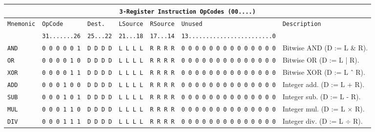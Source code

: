 \documentclass{report}
\begin{document}
{\footnotesize
\begin{center}
\begin{tabular}[ht]{
	| p{} | p{} | p{} | p{}
	| p{} | p{} | p{} |
}
	\hline
	\multicolumn{7}{|c|}{\texttt{3-Register Instruction OpCodes (00....)}} \\
	\hline \hline
	
	\multirow{2}{*}{\texttt{Mnemonic}} & \texttt{OpCode} & \texttt{Dest.} & \texttt{LSource} & \texttt{RSource} &
		\texttt{Unused} & \multirow{2}{*}{\texttt{Description}} \\
	& \texttt{31.......26} & \texttt{25...22} & \texttt{21...18} & \texttt{17...14} &
		\texttt{13........................0} & \\
	\hline
	
	\texttt{AND} & \texttt{0 0 0 0 0 1} & \texttt{D D D D} & \texttt{L L L L} & \texttt{R R R R} &
		\texttt{0 0 0 0 0 0 0 0 0 0 0 0 0 0} & Bitwise AND (D := L \& R). \\
	\hline
	
	\texttt{OR} & \texttt{0 0 0 0 1 0} & \texttt{D D D D} & \texttt{L L L L} & \texttt{R R R R} &
		\texttt{0 0 0 0 0 0 0 0 0 0 0 0 0 0} & Bitwise OR (D := L | R). \\
	\hline
	
	\texttt{XOR} & \texttt{0 0 0 0 1 1} & \texttt{D D D D} & \texttt{L L L L} & \texttt{R R R R} &
		\texttt{0 0 0 0 0 0 0 0 0 0 0 0 0 0} & Bitwise XOR (D := L ${\mathchar"5E}$ R). \\
	\hline
	
	\texttt{ADD} & \texttt{0 0 0 1 0 0} & \texttt{D D D D} & \texttt{L L L L} & \texttt{R R R R} &
		\texttt{0 0 0 0 0 0 0 0 0 0 0 0 0 0} & Integer add. (D := L + R). \\
	\hline
	
	\texttt{SUB} & \texttt{0 0 0 1 0 1} & \texttt{D D D D} & \texttt{L L L L} & \texttt{R R R R} &
		\texttt{0 0 0 0 0 0 0 0 0 0 0 0 0 0} & Integer sub. (D := L - R). \\
	\hline
	
	\texttt{MUL} & \texttt{0 0 0 1 1 0} & \texttt{D D D D} & \texttt{L L L L} & \texttt{R R R R} &
		\texttt{0 0 0 0 0 0 0 0 0 0 0 0 0 0} & Integer mul. (D := L $\times$ R). \\
	\hline
	
	\texttt{DIV} & \texttt{0 0 0 1 1 1} & \texttt{D D D D} & \texttt{L L L L} & \texttt{R R R R} &
		\texttt{0 0 0 0 0 0 0 0 0 0 0 0 0 0} & Integer div. (D := L $\div$ R). \\
	\hline
	

\end{tabular}
\end{center}}
\end{document}
